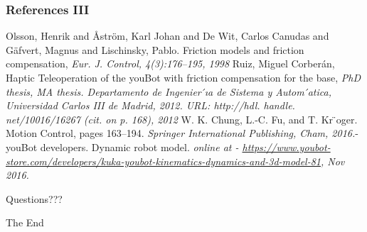 \documentclass{beamer}
\begin{document}
\begin{frame}
	\frametitle{References III}
	\footnotesize{
	\begin{thebibliography}{99} 

	 Olsson, Henrik and {\AA}str{\"o}m, Karl Johan and De Wit, Carlos Canudas and G{\"a}fvert, Magnus and Lischinsky, Pablo. Friction models and friction compensation, \emph{Eur. J. Control, 4(3):176–195, 1998}
	 Ruiz, Miguel Corber{\'a}n, Haptic Teleoperation of the youBot with friction compensation for the base, \emph{PhD thesis, MA thesis. Departamento de Ingenier ́ıa de Sistema y Autom ́atica,
Universidad Carlos III de Madrid, 2012. URL: http://hdl. handle. net/10016/16267 (cit. on p. 168), 2012}
	 W. K. Chung, L.-C. Fu, and T. Kr ̈oger. Motion Control, pages 163–194. \emph{Springer International Publishing, Cham, 2016.}-
	 youBot developers. Dynamic robot model. \emph{online at - \url{https://www.youbot-store.com/developers/kuka-youbot-kinematics-dynamics-and-3d-model-81}, Nov 2016.}
\end{thebibliography}
	}
\end{frame}
\begin{frame}
	\Huge{\centerline{Questions???}}
\end{frame}

\begin{frame}
	\Huge{\centerline{The End}}
\end{frame}
\end{document}
